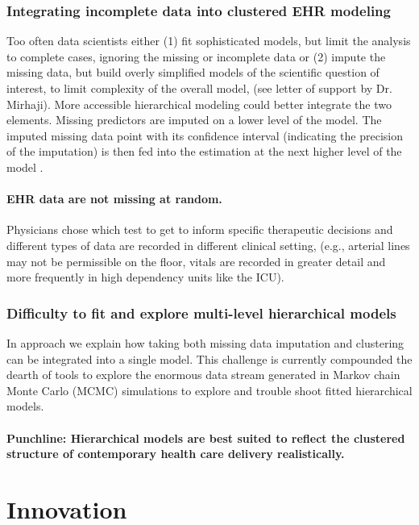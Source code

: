 \documentclass[11pt,notitlepage]{article}
\begin{document}
\section*{Integrating incomplete data into clustered EHR modeling}

Too often data scientists either (1) fit sophisticated models, but limit the analysis to complete cases, ignoring the missing or incomplete data or (2) impute the missing data, but build overly simplified models of the scientific question of interest, to limit complexity of the overall model, (see letter of support by Dr. Mirhaji). More accessible hierarchical modeling could better integrate the two elements. Missing predictors are imputed on a lower level of the model. The imputed missing data point with its confidence interval (indicating the precision of the imputation) is then fed into the estimation at the next higher level of the model \cite{Gelman2001imputation}. 

\subsection*{EHR data are not missing at random.} Physicians chose which test to get to inform specific therapeutic decisions and different types of data are recorded in different clinical setting, (e.g., arterial lines may not be permissible on the floor, vitals are recorded in greater detail and more frequently in high dependency units like the ICU). 

\section*{Difficulty to fit and explore multi-level hierarchical models}
In approach we explain  how taking both missing data imputation and clustering can be integrated into a single model. This challenge is currently compounded the dearth of tools to explore the enormous data stream generated in Markov chain Monte Carlo (MCMC) simulations to explore and trouble shoot fitted hierarchical models.  

\subsection*{Punchline: Hierarchical models  are best suited to reflect the clustered structure of contemporary health care delivery realistically.}

\part*{Innovation}
\end{document}
